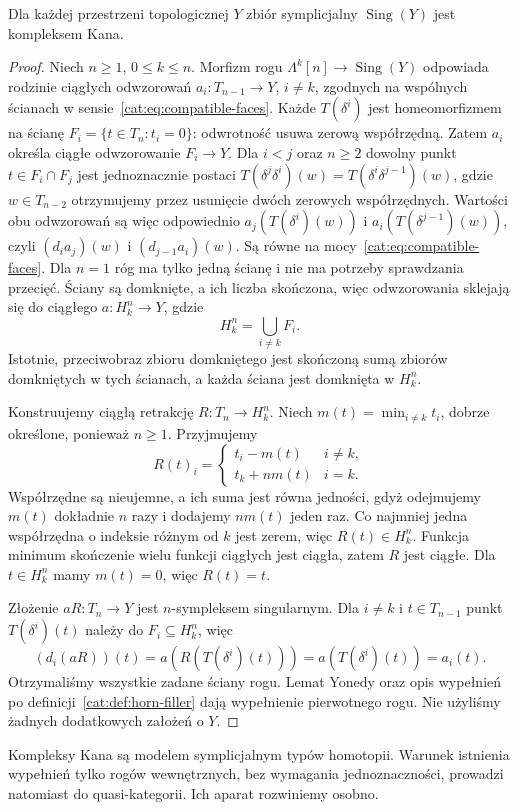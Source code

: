 \begin{twierdzenie}\label{cat:thm:sing-kan}
Dla każdej przestrzeni topologicznej $Y$ zbiór symplicjalny $\operatorname{Sing}(Y)$ jest kompleksem Kana.
\end{twierdzenie}
\begin{proof}
Niech $n\geq1$, $0\leq k\leq n$. Morfizm rogu $\Lambda^k[n]\to\operatorname{Sing}(Y)$ odpowiada rodzinie ciągłych odwzorowań $a_i:T_{n-1}\to Y$, $i\ne k$, zgodnych na wspólnych ścianach w sensie~\eqref{cat:eq:compatible-faces}. Każde $T(\delta^i)$ jest homeomorfizmem na ścianę $F_i=\{t\in T_n:t_i=0\}$: odwrotność usuwa zerową współrzędną. Zatem $a_i$ określa ciągłe odwzorowanie $F_i\to Y$. Dla $i<j$ oraz $n\geq2$ dowolny punkt $t\in F_i\cap F_j$ jest jednoznacznie postaci $T(\delta^j\delta^i)(w)=T(\delta^i\delta^{j-1})(w)$, gdzie $w\in T_{n-2}$ otrzymujemy przez usunięcie dwóch zerowych współrzędnych. Wartości obu odwzorowań są więc odpowiednio $a_j(T(\delta^i)(w))$ i $a_i(T(\delta^{j-1})(w))$, czyli $(d_i a_j)(w)$ i $(d_{j-1}a_i)(w)$. Są równe na mocy~\eqref{cat:eq:compatible-faces}. Dla $n=1$ róg ma tylko jedną ścianę i nie ma potrzeby sprawdzania przecięć. Ściany są domknięte, a ich liczba skończona, więc odwzorowania sklejają się do ciągłego $a:H_k^n\to Y$, gdzie
\[
 H_k^n=\bigcup_{i\ne k} F_i.
\]
Istotnie, przeciwobraz zbioru domkniętego jest skończoną sumą zbiorów domkniętych w tych ścianach, a każda ściana jest domknięta w $H_k^n$.

Konstruujemy ciągłą retrakcję $R:T_n\to H_k^n$. Niech $m(t)=\min_{i\ne k}t_i$, dobrze określone, ponieważ $n\geq1$. Przyjmujemy
\[
 R(t)_i=
 \begin{cases}
 t_i-m(t)&i\ne k,\\
 t_k+nm(t)&i=k.
 \end{cases}
\]
Współrzędne są nieujemne, a ich suma jest równa jedności, gdyż odejmujemy $m(t)$ dokładnie $n$ razy i dodajemy $nm(t)$ jeden raz. Co najmniej jedna współrzędna o indeksie różnym od $k$ jest zerem, więc $R(t)\in H_k^n$. Funkcja minimum skończenie wielu funkcji ciągłych jest ciągła, zatem $R$ jest ciągłe. Dla $t\in H_k^n$ mamy $m(t)=0$, więc $R(t)=t$.

Złożenie $aR:T_n\to Y$ jest $n$-sympleksem singularnym. Dla $i\ne k$ i $t\in T_{n-1}$ punkt $T(\delta^i)(t)$ należy do $F_i\subseteq H_k^n$, więc
\[
 (d_i(aR))(t)=a(R(T(\delta^i)(t)))
             =a(T(\delta^i)(t))=a_i(t).
\]
Otrzymaliśmy wszystkie zadane ściany rogu. Lemat Yonedy oraz opis wypełnień po definicji~\ref{cat:def:horn-filler} dają wypełnienie pierwotnego rogu. Nie użyliśmy żadnych dodatkowych założeń o $Y$.
\end{proof}

Kompleksy Kana są modelem symplicjalnym typów homotopii. Warunek istnienia wypełnień tylko rogów wewnętrznych, bez wymagania jednoznaczności, prowadzi natomiast do quasi-kategorii. Ich aparat rozwiniemy osobno.
